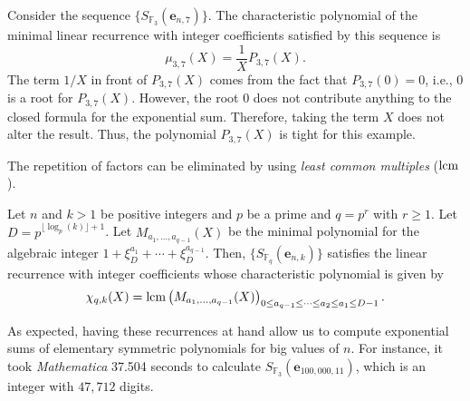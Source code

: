 \begin{example}
 Consider the sequence $\{S_{\mathbb{F}_3}(\boldsymbol{e}_{n,7})\}$.  The characteristic polynomial of the minimal linear recurrence with integer coefficients satisfied by 
 this sequence is 
 $$\mu_{3,7}(X)=\frac{1}{X}P_{3,7}(X).$$
The term $1/X$ in front of $P_{3,7}(X)$ comes from the fact that $P_{3,7}(0)=0$, i.e., 0 is a root for $P_{3,7}(X)$.  However, the root 0 does not contribute anything to the closed formula for the exponential sum.
Therefore, taking the term $X$ does not alter the result.  Thus, the polynomial $P_{3,7}(X)$ is tight for this example.
\end{example}

The repetition of factors can be eliminated by using {\it least common multiples} ($\operatorname{lcm}$).

\begin{theorem}
 Let $n$ and $k>1$ be positive integers and $p$ be a prime and $q=p^r$ with $r\geq 1$.  Let $D=p^{\lfloor\log_p(k)\rfloor+1}$.  Let $M_{a_1,\ldots,a_{q-1}}(X)$ be the minimal polynomial
 for the algebraic integer $1+\xi_D^{a_1}+\cdots+\xi_D^{a_{q-1}}$.  Then, $\{S_{\mathbb{F}_q}(\boldsymbol{e}_{n,k})\}$ satisfies the linear recurrence with integer coefficients whose characteristic
 polynomial is given by
 $$\chi_{q,k}(X)=\operatorname{lcm}\left(M_{a_1,\ldots,a_{q-1}}(X)\right)_{0\leq a_{q-1}\leq \cdots \leq a_2\leq a_1 \leq D-1}.$$
\end{theorem}

\begin{remark}
As expected, having these recurrences at hand allow us to compute exponential sums of elementary symmetric polynomials for big values of $n$.  For instance, it took {\it Mathematica} 37.504 seconds to calculate
$S_{\mathbb{F}_3}(\boldsymbol{e}_{100,000,11})$, which is an integer with $47,712$ digits.
 
\end{remark}

